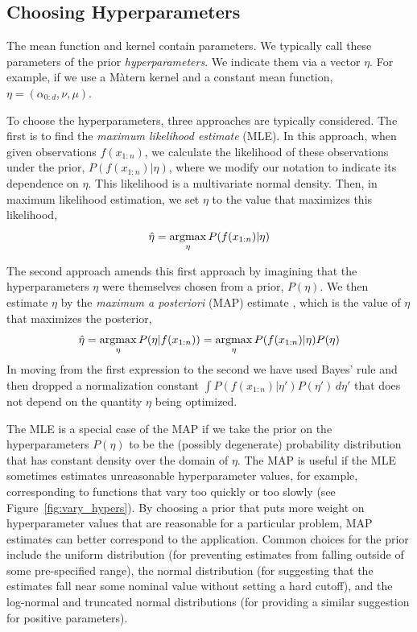 \documentclass{article}
\begin{document}
\subsection{Choosing Hyperparameters} 
\label{sec:hyperparameters}

The mean function and kernel contain parameters.  We typically call these parameters of the prior {\it hyperparameters}.  We indicate them via a vector $\eta$.  For example, if we use a M\`atern kernel and a constant mean function, $\eta = (\alpha_{0:d}, \nu, \mu)$.

To choose the hyperparameters, three approaches are typically considered.  The first is to find the {\it maximum likelihood estimate} (MLE).  In this approach, when given observations $f(x_{1:n})$, we calculate the likelihood of these observations under the prior, $P(f(x_{1:n}) | \eta)$, where we modify our notation to indicate its dependence on $\eta$.  This likelihood is a multivariate normal density.  Then, in maximum likelihood estimation, we set $\eta$ to the value that maximizes this likelihood,
\begin{equation*}
\hat{\eta} = \mathop{\mathrm{argmax}}_\eta P(f(x_{1:n}) | \eta)
\end{equation*}

The second approach amends this first approach by imagining that the hyperparameters $\eta$ were themselves chosen from a prior, $P(\eta)$.  
We then estimate $\eta$ by
the {\it maximum a posteriori} (MAP) estimate \citep{gelman2014bayesian}, which is the value of $\eta$ that maximizes the posterior,
\begin{equation*}
\hat{\eta} = \mathop{\mathrm{argmax}}_\eta P(\eta | f(x_{1:n})) = \mathop{\mathrm{argmax}}_\eta P(f(x_{1:n}) | \eta) P(\eta)
\end{equation*}
In moving from the first expression to the second we have used Bayes' rule and then dropped a normalization constant 
$\int P(f(x_{1:n}) | \eta') P(\eta')\, d\eta'$ that does not depend on the quantity $\eta$ being optimized.

The MLE is a special case of the MAP if we take the prior on the hyperparameters $P(\eta)$ to be the (possibly degenerate) probability distribution that has constant density over the domain of $\eta$.
The MAP is useful if the MLE sometimes estimates unreasonable hyperparameter values, for example, corresponding to functions that vary too quickly or too slowly (see Figure~\ref{fig:vary_hypers}).
By choosing a prior that puts more weight on hyperparameter values that are reasonable for a particular problem, MAP estimates can better correspond to the application.  Common choices for the prior include the uniform distribution (for preventing estimates from falling outside of some pre-specified range), the normal distribution (for suggesting that the estimates fall near some nominal value without setting a hard cutoff), and the log-normal and truncated normal distributions (for providing a similar suggestion for positive parameters).
\end{document}
